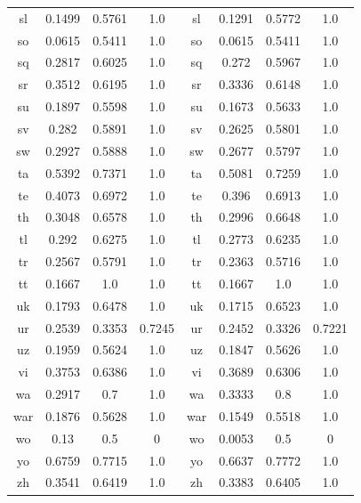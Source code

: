 \begin{figure}[h]
\begin{tabular}{cccc|cccc}
sl&0.1499&0.5761&1.0&	sl&0.1291&0.5772&1.0\\
so&0.0615&0.5411&1.0&	so&0.0615&0.5411&1.0\\
sq&0.2817&0.6025&1.0&	sq&0.272&0.5967&1.0\\
sr&0.3512&0.6195&1.0&	sr&0.3336&0.6148&1.0\\
su&0.1897&0.5598&1.0&	su&0.1673&0.5633&1.0\\
sv&0.282&0.5891&1.0&	sv&0.2625&0.5801&1.0\\
sw&0.2927&0.5888&1.0&	sw&0.2677&0.5797&1.0\\
ta&0.5392&0.7371&1.0&	ta&0.5081&0.7259&1.0\\
te&0.4073&0.6972&1.0&	te&0.396&0.6913&1.0\\
th&0.3048&0.6578&1.0&	th&0.2996&0.6648&1.0\\
tl&0.292&0.6275&1.0&	tl&0.2773&0.6235&1.0\\
tr&0.2567&0.5791&1.0&	tr&0.2363&0.5716&1.0\\
tt&0.1667&1.0&1.0&	tt&0.1667&1.0&1.0\\
uk&0.1793&0.6478&1.0&	uk&0.1715&0.6523&1.0\\
ur&0.2539&0.3353&0.7245&	ur&0.2452&0.3326&0.7221\\
uz&0.1959&0.5624&1.0&	uz&0.1847&0.5626&1.0\\
vi&0.3753&0.6386&1.0&	vi&0.3689&0.6306&1.0\\
wa&0.2917&0.7&1.0&	wa&0.3333&0.8&1.0\\
war&0.1876&0.5628&1.0&	war&0.1549&0.5518&1.0\\
wo&0.13&0.5&0&	wo&0.0053&0.5&0\\
yo&0.6759&0.7715&1.0&	yo&0.6637&0.7772&1.0\\
zh&0.3541&0.6419&1.0&	zh&0.3383&0.6405&1.0\\
\hline\hline
\end{tabular}
\end{figure}
